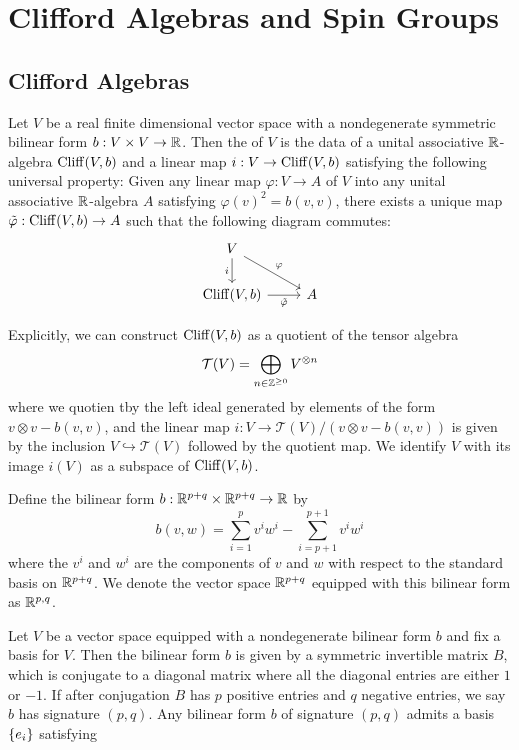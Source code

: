 
\chapter{Clifford Algebras and Spin Groups}
%
\subsectionend
%
\section{Clifford Algebras}
%
\begin{defn}
Let $V$ be a real finite dimensional vector space with a nondegenerate
symmetric bilinear form $b : V \times V \to \mathbb{R}$. Then the 
of $V$ is the data of a unital associative $\mathbb{R}$-algebra $\operatorname{Cliff}(V,b)$ and a linear
map $i : V \to \operatorname{Cliff}(V,b)$ satisfying the following universal property:
Given any linear map $\varphi : V \to A$ of $V$ into any unital associative
$\mathbb{R}$-algebra $A$ satisfying $\varphi(v)^2 = b(v,v)$, there exists a unique map
$\tilde{\varphi}: \operatorname{Cliff}(V,b) \to A$ such that the following diagram commutes:
%
\[\begin{tikzcd}
V \ar[dr, "\varphi"] \ar[d, "i"'] \\
\Cliff(V,b) \ar[r, "\tilde{\varphi}"'] & A
\end{tikzcd}\]
\end{defn}
%
Explicitly, we can construct $\operatorname{Cliff}(V,b)$ as a quotient of the tensor algebra
\[
\mathcal{T}(V) = \bigoplus_{n \in \mathbb{Z}^{\geq 0}} V^{\otimes n}
\]
where we quotien tby the left ideal generated by elements of the form
$v \otimes v - b(v,v)$, and the linear map
$i: V \to \mathcal{T}(V) / (v \otimes v - b(v,v))$
is given by the inclusion $V \hookrightarrow \mathcal{T}(V)$ followed by the
quotient map. We identify $V$ with its image $i(V)$ as a subspace of $\operatorname{Cliff}(V,b)$.
%
\begin{defn}
Define the bilinear form $b : \mathbb{R}^{p+q} \times \mathbb{R}^{p+q} \to \mathbb{R}$ by
\[
b(v,w) = \sum_{i = 1}^{p} v^iw^i - \sum_{i = p+1}^{p+1} v^iw^i
\]
where the $v^i$ and $w^i$ are the components of $v$ and $w$ with respect to
the standard basis on $\mathbb{R}^{p+q}$. We denote the vector space $\mathbb{R}^{p+q}$
equipped with this bilinear form as $\mathbb{R}^{p,q}$.
\end{defn}
%
Let $V$ be a vector space equipped with a nondegenerate bilinear form $b$ and
fix a basis for $V$. Then the bilinear form $b$ is given by a symmetric
invertible matrix $B$, which is conjugate to a diagonal matrix where all
the diagonal entries are either $1$ or $-1$. If after conjugation $B$ has
$p$ positive entries and $q$ negative entries, we say $b$ has signature $(p,q)$.
Any bilinear form $b$ of signature $(p,q)$ admits a basis $\left\lbrace e_i \right\rbrace$ satisfying
